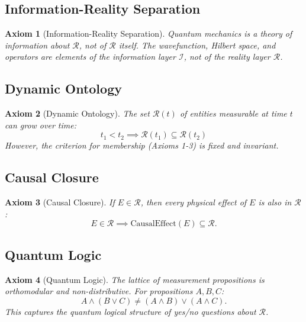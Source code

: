 \documentclass[aps,preprint,showpacs,showkeys]{revtex4}
\newtheorem{axiom}{Axiom}
\begin{document}
\subsection{Information-Reality Separation}

\begin{axiom}[Information-Reality Separation]
Quantum mechanics is a theory of \emph{information about} $\mathcal{R}$, not
of $\mathcal{R}$ itself. The wavefunction, Hilbert space, and operators are
elements of the information layer $\mathcal{I}$, not of the reality layer $%
\mathcal{R}$.
\end{axiom}

\subsection{Dynamic Ontology}

\begin{axiom}[Dynamic Ontology]
The set $\mathcal{R}(t)$ of entities measurable at time $t$ can grow over
time: 
\begin{equation}
t_1 < t_2 \implies \mathcal{R}(t_1) \subseteq \mathcal{R}(t_2)
\end{equation}
However, the criterion for membership (Axioms 1-3) is fixed and invariant.
\end{axiom}

\subsection{Causal Closure}

\begin{axiom}[Causal Closure]
If $E \in \mathcal{R}$, then every physical effect of $E$ is also in $%
\mathcal{R}$: 
\begin{equation}
E \in \mathcal{R} \implies \text{CausalEffect}(E) \subseteq \mathcal{R}.
\end{equation}
\end{axiom}

\subsection{Quantum Logic}

\begin{axiom}[Quantum Logic]
The lattice of measurement propositions is orthomodular and
non-distributive. For propositions $A, B, C$: 
\begin{equation}
A \wedge (B \vee C) \neq (A \wedge B) \vee (A \wedge C).
\end{equation}
This captures the quantum logical structure of yes/no questions about $%
\mathcal{R}$.
\end{axiom}
\end{document}
